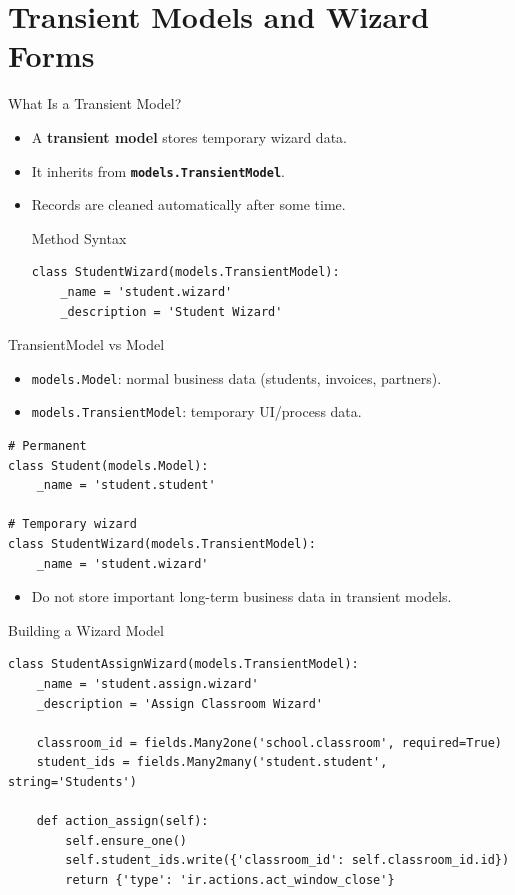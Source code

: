 \section{Transient Models and Wizard Forms}


\begin{frame}[fragile]{What Is a Transient Model?}
	\begin{itemize}
		\item A \textbf{transient model} stores temporary wizard data.
		\item It inherits from \textbf{\texttt{models.TransientModel}}.
		\item Records are cleaned automatically after some time.
\begin{block}{Method Syntax}
\begin{lstlisting}
class StudentWizard(models.TransientModel):
	_name = 'student.wizard'
	_description = 'Student Wizard'
\end{lstlisting}
\end{block}
	\end{itemize}
\end{frame}

\begin{frame}[fragile]{TransientModel vs Model}
	\begin{itemize}
		\item \texttt{models.Model}: normal business data (students, invoices, partners).
		\item \texttt{models.TransientModel}: temporary UI/process data.
	\end{itemize}
\begin{lstlisting}
# Permanent
class Student(models.Model):
	_name = 'student.student'

# Temporary wizard
class StudentWizard(models.TransientModel):
	_name = 'student.wizard'
\end{lstlisting}
	\begin{itemize}
		\item Do not store important long-term business data in transient models.
	\end{itemize}
\end{frame}

\begin{frame}[fragile]{Building a Wizard Model}
\begin{lstlisting}
class StudentAssignWizard(models.TransientModel):
	_name = 'student.assign.wizard'
	_description = 'Assign Classroom Wizard'

	classroom_id = fields.Many2one('school.classroom', required=True)
	student_ids = fields.Many2many('student.student', string='Students')

	def action_assign(self):
		self.ensure_one()
		self.student_ids.write({'classroom_id': self.classroom_id.id})
		return {'type': 'ir.actions.act_window_close'}
\end{lstlisting}
\end{frame}

